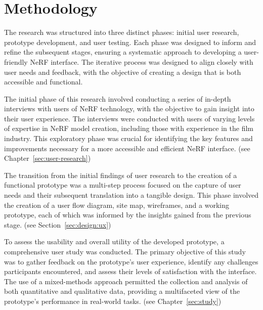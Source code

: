 %
\chapter{Methodology}
\label{sec:methodology}

The research was structured into three distinct phases: initial user research, prototype development, and user testing.
Each phase was designed to inform and refine the subsequent stages, ensuring a systematic approach to developing a user-friendly NeRF interface.
The iterative process was designed to align closely with user needs and feedback, with the objective of creating a design that is both accessible and functional.

The initial phase of this research involved conducting a series of in-depth interviews with users of NeRF technology, with the objective to gain insight into their user experience.
The interviews were conducted with users of varying levels of expertise in NeRF model creation, including those with experience in the film industry.
This exploratory phase was crucial for identifying the key features and improvements necessary for a more accessible and efficient NeRF interface.
(see Chapter~\ref{sec:user-research})

The transition from the initial findings of user research to the creation of a functional prototype was a multi-step process focused on the capture of user needs and their subsequent translation into a tangible design.
This phase involved the creation of a user flow diagram, site map, wireframes, and a working prototype, each of which was informed by the insights gained from the previous stage.
(see Section~\ref{sec:design:ux})

To assess the usability and overall utility of the developed prototype, a comprehensive user study was conducted.
The primary objective of this study was to gather feedback on the prototype's user experience, identify any challenges participants encountered, and assess their levels of satisfaction with the interface.
The use of a mixed-methods approach permitted the collection and analysis of both quantitative and qualitative data, providing a multifaceted view of the prototype's performance in real-world tasks.
(see Chapter~\ref{sec:study})
